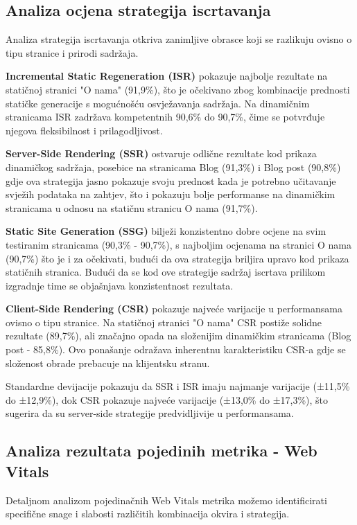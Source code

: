 \subsection{Analiza ocjena strategija iscrtavanja}

Analiza strategija iscrtavanja otkriva zanimljive obrasce koji se razlikuju ovisno o tipu stranice i prirodi sadržaja.

\textbf{Incremental Static Regeneration (ISR)} pokazuje najbolje rezultate na statičnoj stranici "O nama" (91,9\%), što je očekivano zbog kombinacije prednosti statičke generacije s mogućnošću osvježavanja sadržaja. Na dinamičnim stranicama ISR zadržava kompetentnih 90,6\% do 90,7\%, čime se potvrđuje njegova fleksibilnost i prilagodljivost.

\textbf{Server-Side Rendering (SSR)} ostvaruje odlične rezultate kod prikaza dinamičkog sadržaja, posebice na stranicama Blog (91,3\%) i Blog post (90,8\%) gdje ova strategija jasno pokazuje svoju prednost kada je potrebno učitavanje svježih podataka na zahtjev, što i pokazuju bolje performanse na dinamičkim stranicama u odnosu na statičnu stranicu O nama (91,7\%).

\textbf{Static Site Generation (SSG)} bilježi konzistentno dobre ocjene na svim testiranim stranicama (90,3\% - 90,7\%), s najboljim ocjenama na stranici O nama (90,7\%) što je i za očekivati, budući da ova strategija briljira upravo kod prikaza statičnih stranica. Budući da se kod ove strategije sadržaj iscrtava prilikom izgradnje time se objašnjava konzistentnost rezultata.

\textbf{Client-Side Rendering (CSR)} pokazuje najveće varijacije u performansama ovisno o tipu stranice. Na statičnoj stranici "O nama" CSR postiže solidne rezultate (89,7\%), ali značajno opada na složenijim dinamičkim stranicama (Blog post - 85,8\%). Ovo ponašanje odražava inherentnu karakteristiku CSR-a gdje se složenost obrade prebacuje na klijentsku stranu.

Standardne devijacije pokazuju da SSR i ISR imaju najmanje varijacije (±11,5\% do ±12,9\%), dok CSR pokazuje najveće varijacije (±13,0\% do ±17,3\%), što sugerira da su server-side strategije predvidljivije u performansama.

\subsection{Analiza rezultata pojedinih metrika - Web Vitals}

Detaljnom analizom pojedinačnih Web Vitals metrika možemo identificirati specifične snage i slabosti različitih kombinacija okvira i strategija.

